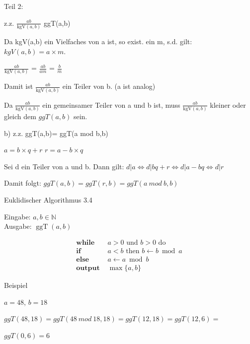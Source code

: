 \documentclass[10pt]{beamer}
\begin{document}
\begin{frame}

Teil 2: 

z.z. $\frac{ab}{\text{kgV}(a,b)}$   \le ggT(a,b)
\vspace{0.2cm}

\noindent Da kgV(a,b) ein Vielfaches von a ist, so exist. ein m, s.d. gilt: $kgV(a,b) = a \times m.$ 

\vspace{=0.2cm}
$\frac{ab}{\text{kgV}(a,b)}$  = $\frac{ab}{am}$ = $\frac{b}{m}$
\vspace{0.3cm}


\noindent Damit ist $\frac{ab}{\text{kgV}(a,b)}$ ein Teiler von b. (a ist analog)

\noindent Da $\frac{ab}{\text{kgV}(a,b)}$ ein gemeinsamer Teiler von a und b ist, muss $\frac{ab}{\text{kgV}(a,b)}$ kleiner oder gleich dem $ggT(a,b)$ sein.
\end{frame}

\begin{frame}
b) 
z.z. ggT(a,b)= ggT(a mod b,b)

\vspace{0.2cm}
$a= b\times q + r$  \iff   $r= a - b\times q$

\noindent Sei d ein Teiler von a und b. Dann gilt: $d | a \iff d | bq+r \iff d | a- bq \iff d | r$

\vspace{0.3cm}
\noindent Damit folgt: $ggT(a,b)= ggT(r,b) = ggT(a \ mod \  b, b)$

\end{frame}


\begin{frame}{Euklidischer Algorithmus 3.4}



Eingabe: $a,b \in \mathbb{N}$ \\
Ausgabe: $\operatorname{ggT}(a,b)$

\begin{align*}
\textbf{while } & a > 0 \text{ und } b > 0 \text{ do} \\
\textbf{if } & a < b \text{ then } b \leftarrow b \bmod a \\
\textbf{else } & a \leftarrow a \bmod b \\
\textbf{output } & \max\{a,b\}
\end{align*}
    
\end{frame}

\begin{frame}{Beispiel}

$a= 48$, $b= 18$
\vspace{0.1cm}


$ggT(48,18)= ggT( 48 \ mod \ 18, 18)= ggT(12,18)= ggT(12,6)=$


\indent $ggT(0,6)= 6 $
    
\end{frame}
\end{document}
